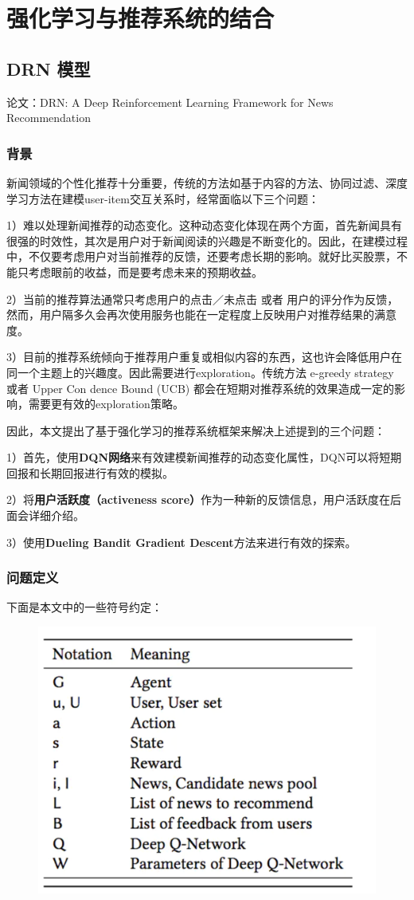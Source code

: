 \documentclass[12pt]{article}
\begin{document}
\section{强化学习与推荐系统的结合}
\subsection{DRN 模型\cite{Recommender_System_With_Deep_Learning_DRN}}
论文：DRN: A Deep Reinforcement Learning Framework for News Recommendation

\subsubsection{背景}
新闻领域的个性化推荐十分重要，传统的方法如基于内容的方法、协同过滤、深度学习方法在建模user-item交互关系时，经常面临以下三个问题：

1）难以处理新闻推荐的动态变化。这种动态变化体现在两个方面，首先新闻具有很强的时效性，其次是用户对于新闻阅读的兴趣是不断变化的。因此，在建模过程中，不仅要考虑用户对当前推荐的反馈，还要考虑长期的影响。就好比买股票，不能只考虑眼前的收益，而是要考虑未来的预期收益。

2）当前的推荐算法通常只考虑用户的点击／未点击 或者 用户的评分作为反馈，然而，用户隔多久会再次使用服务也能在一定程度上反映用户对推荐结果的满意度。

3）目前的推荐系统倾向于推荐用户重复或相似内容的东西，这也许会降低用户在同一个主题上的兴趣度。因此需要进行exploration。传统方法 e-greedy strategy 或者 Upper Con dence Bound (UCB) 都会在短期对推荐系统的效果造成一定的影响，需要更有效的exploration策略。

因此，本文提出了基于强化学习的推荐系统框架来解决上述提到的三个问题：

1）首先，使用\textbf{DQN网络}来有效建模新闻推荐的动态变化属性，DQN可以将短期回报和长期回报进行有效的模拟。

2）将\textbf{用户活跃度（activeness score）}作为一种新的反馈信息，用户活跃度在后面会详细介绍。

3）使用\textbf{Dueling Bandit Gradient Descent}方法来进行有效的探索。

\subsubsection{问题定义}
下面是本文中的一些符号约定：
\begin{figure}[H]
    \centering
    \includegraphics[width=.4\textwidth]{fig/DRN_Notations.png}
\end{figure}
\end{document}
